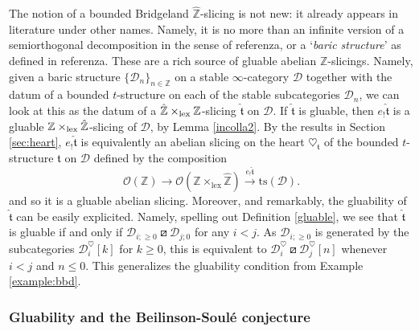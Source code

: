 \documentclass{article}
\theoremstyle{definition}
\newcommand{\Z}{\mathbb{Z}}
\newcommand{\Oo}{\mathcal{O}}
\newcommand{\ts}{\mathrm{ts}}
\newcommand{\tee}{\mathfrak{t}}
\newcommand{\orth}{\boxslash}
\newcommand{\lex}{\times_{\textnormal{lex}}}
\begin{document}
  The notion of a bounded Bridgeland $\hat{\Z}$-slicing is not new: it already appears in literature under other names. Namely, it is no more than an infinite version of a semiorthogonal decomposition in the sense of {\color{red} referenza}, or a `\textit{baric structure}' as defined in {\color{red} referenza}. These are a rich source of gluable abelian $\Z$-slicings. Namely, given a baric structure $\{\mathscr{D}_{n}\}_{n\in \mathbb{Z}}$ on a stable $\infty$-category $\mathscr{D}$ together with the datum of a bounded $t$-structure on each of the stable subcategories $\mathscr{D}_{n}$, we can look at this as the datum of a $\hat{\Z} \lex \Z$-slicing $\hat{\tee}$ on $\mathscr{D}$. If $\hat{\tee}$ is gluable, then $e_!\hat{\tee}$ is a gluable ${\Z} \lex \hat{\Z}$-slicing of $\mathscr{D}$, by Lemma \ref{incolla2}. By the results in Section \ref{sec:heart}, $e_!\hat{\tee}$ is equivalently an abelian slicing on the heart $\heartsuit_{{\tee}}$ of the bounded $t$-structure ${\tee}$ on $\mathscr{D}$ defined by the composition
  \[
 \Oo(\Z)\to \Oo(\Z\times_{\mathrm{lex}}\hat{\Z})\xrightarrow{e_!\hat{\tee}} \ts(\mathscr{D}).
  \]
 and so it is a gluable abelian slicing. {\color{red}Moreover, and remarkably, the gluability of $\hat{\tee}$ can be easily explicited. Namely, spelling out Definition \ref{gluable}, we see that $\hat{\tee}$ is gluable if and only if  $\mathscr{D}_{i;\geq 0}\orth \mathscr{D}_{j;0}$ for any $i<j$. {\color{red}As  $\mathscr{D}_{i;\geq 0}$ is generated by the subcategories $\mathscr{D}_{i}^\heartsuit[k]$ for $k\geq 0$, this is equivalent to $\mathscr{D}_{i}^\heartsuit\orth\mathscr{D}_{j}^\heartsuit[n]$ whenever $i<j$ and $n\leq 0$. This generalizes the gluability condition from Example \ref{example:bbd}.} 
 }

\subsubsection{Gluability and the Beilinson-Soul\'e conjecture}
\end{document}
